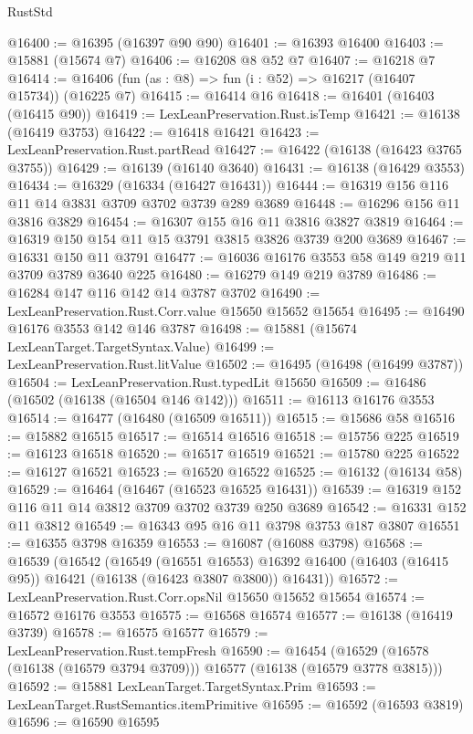 \begin{lexlean}{RustStd}
\begin{coremodule}
@16400 := @16395 (@16397 @90 @90)
@16401 := @16393 @16400
@16403 := @15881 (@15674 @7)
@16406 := @16208 @8 @52 @7
@16407 := @16218 @7
@16414 := @16406 (fun (as : @8) => fun (i : @52) => @16217 (@16407 @15734)) (@16225 @7)
@16415 := @16414 @16
@16418 := @16401 (@16403 (@16415 @90))
@16419 := LexLeanPreservation.Rust.isTemp
@16421 := @16138 (@16419 @3753)
@16422 := @16418 @16421
@16423 := LexLeanPreservation.Rust.partRead
@16427 := @16422 (@16138 (@16423 @3765 @3755))
@16429 := @16139 (@16140 @3640)
@16431 := @16138 (@16429 @3553)
@16434 := @16329 (@16334 (@16427 @16431))
@16444 := @16319 @156 @116 @11 @14 @3831 @3709 @3702 @3739 @289 @3689
@16448 := @16296 @156 @11 @3816 @3829
@16454 := @16307 @155 @16 @11 @3816 @3827 @3819
@16464 := @16319 @150 @154 @11 @15 @3791 @3815 @3826 @3739 @200 @3689
@16467 := @16331 @150 @11 @3791
@16477 := @16036 @16176 @3553 @58 @149 @219 @11 @3709 @3789 @3640 @225
@16480 := @16279 @149 @219 @3789
@16486 := @16284 @147 @116 @142 @14 @3787 @3702
@16490 := LexLeanPreservation.Rust.Corr.value @15650 @15652 @15654
@16495 := @16490 @16176 @3553 @142 @146 @3787
@16498 := @15881 (@15674 LexLeanTarget.TargetSyntax.Value)
@16499 := LexLeanPreservation.Rust.litValue
@16502 := @16495 (@16498 (@16499 @3787))
@16504 := LexLeanPreservation.Rust.typedLit @15650
@16509 := @16486 (@16502 (@16138 (@16504 @146 @142)))
@16511 := @16113 @16176 @3553
@16514 := @16477 (@16480 (@16509 @16511))
@16515 := @15686 @58
@16516 := @15882 @16515
@16517 := @16514 @16516
@16518 := @15756 @225
@16519 := @16123 @16518
@16520 := @16517 @16519
@16521 := @15780 @225
@16522 := @16127 @16521
@16523 := @16520 @16522
@16525 := @16132 (@16134 @58)
@16529 := @16464 (@16467 (@16523 @16525 @16431))
@16539 := @16319 @152 @116 @11 @14 @3812 @3709 @3702 @3739 @250 @3689
@16542 := @16331 @152 @11 @3812
@16549 := @16343 @95 @16 @11 @3798 @3753 @187 @3807
@16551 := @16355 @3798 @16359
@16553 := @16087 (@16088 @3798)
@16568 := @16539
    (@16542
      (@16549
        (@16551 @16553)
        @16392
        @16400
        (@16403 (@16415 @95))
        @16421
        (@16138 (@16423 @3807 @3800))
        @16431))
@16572 := LexLeanPreservation.Rust.Corr.opsNil @15650 @15652 @15654
@16574 := @16572 @16176 @3553
@16575 := @16568 @16574
@16577 := @16138 (@16419 @3739)
@16578 := @16575 @16577
@16579 := LexLeanPreservation.Rust.tempFresh
@16590 := @16454
    (@16529 (@16578 (@16138 (@16579 @3794 @3709))) @16577 (@16138 (@16579 @3778 @3815)))
@16592 := @15881 LexLeanTarget.TargetSyntax.Prim
@16593 := LexLeanTarget.RustSemantics.itemPrimitive
@16595 := @16592 (@16593 @3819)
@16596 := @16590 @16595

\end{coremodule}
\end{lexlean}
